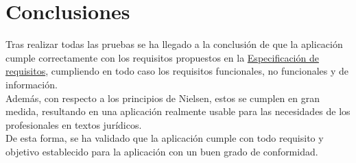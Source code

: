 \section{Conclusiones}

Tras realizar todas las pruebas se ha llegado a la conclusión de que la aplicación cumple correctamente con los requisitos propuestos en la \hyperref[enlaceespecificacion]{Especificación de requisitos}, cumpliendo en todo caso los requisitos funcionales, no funcionales y de información.
\\

Además, con respecto a los principios de Nielsen, estos se cumplen en gran medida, resultando en una aplicación realmente usable para las necesidades de los profesionales en textos jurídicos.
\\

De esta forma, se ha validado que la aplicación cumple con todo requisito y objetivo establecido para la aplicación con un buen grado de conformidad.
